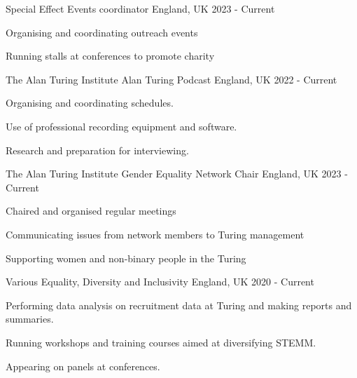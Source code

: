



\begin{cventries}
\cventry
{Special Effect}
{Events coordinator} %
{England, UK}
{2023 - Current}
{ \begin{cvitems} %
    \item {Organising and coordinating outreach events}
    \item {Running stalls at conferences to promote charity}
  \end{cvitems}} %

  \cventry
    {The Alan Turing Institute}
    {Alan Turing Podcast} %
    {England, UK}
    {2022 - Current}
    { \begin{cvitems} %
        \item {Organising and coordinating schedules.}
        \item {Use of professional recording equipment and software.}
        \item {Research and preparation for interviewing.}
      \end{cvitems}} %

    \cventry
      {The Alan Turing Institute}
      {Gender Equality Network Chair} %
      {England, UK}
      {2023 - Current}
      { \begin{cvitems} %
          \item {Chaired and organised regular meetings}
          \item {Communicating issues from network members to Turing management}
          \item {Supporting women and non-binary people in the Turing}
        \end{cvitems}} %

  \cventry
    {Various}
    {Equality, Diversity and Inclusivity} %
    {England, UK}
    {2020 - Current}
    {
    \begin{cvitems} %
        \item {Performing data analysis on recruitment data at Turing and making reports and summaries.}
        \item {Running workshops and training courses aimed at diversifying STEMM.}
        \item {Appearing on panels at conferences.}
      \end{cvitems} } %


\end{cventries}
